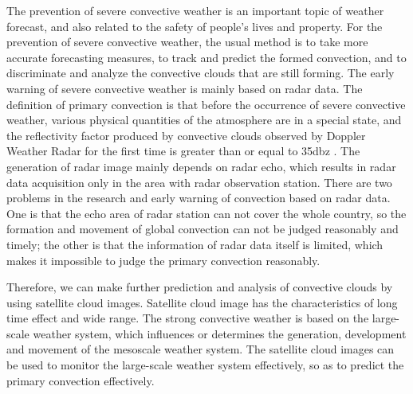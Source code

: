 \begin{eabstract}
The prevention of severe convective weather is an important topic of weather forecast, and also related to the safety of people's lives and property. For the prevention of severe convective weather, the usual method is to take more accurate forecasting measures, to track and predict the formed convection, and to discriminate and analyze the convective clouds that are still forming. The early warning of severe convective weather is mainly based on radar data. The definition of primary convection is that before the occurrence of severe convective weather, various physical quantities of the atmosphere are in a special state, and the reflectivity factor produced by convective clouds observed by Doppler Weather Radar for the first time is greater than or equal to 35dbz \cite{Mecikalski2006Forecasting}. The generation of radar image mainly depends on radar echo, which results in radar data acquisition only in the area with radar observation station. There are two problems in the research and early warning of convection based on radar data. One is that the echo area of radar station can not cover the whole country, so the formation and movement of global convection can not be judged reasonably and timely; the other is that the information of radar data itself is limited, which makes it impossible to judge the primary convection reasonably.

Therefore, we can make further prediction and analysis of convective clouds by using satellite cloud images. Satellite cloud image has the characteristics of long time effect and wide range. The strong convective weather is based on the large-scale weather system, which influences or determines the generation, development and movement of the mesoscale weather system. The satellite cloud images can be used to monitor the large-scale weather system effectively, so as to predict the primary convection effectively.
\end{eabstract}
